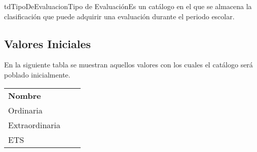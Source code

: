	\begin{TipoDeDato}{tdTipoDeEvaluacion}{Tipo de Evaluación}{Es un catálogo en el que se almacena la clasificación que puede adquirir una evaluación durante el periodo escolar.}
	\begin{tdAtributos}
	\end{tdAtributos}
	
	\subsection{Valores Iniciales}
  En la siguiente tabla se muestran aquellos valores con los cuales el catálogo será poblado inicialmente.
	\begin{longtable}{| p{}| p{}| p{}|}
	 			\rowcolor{colorPrincipal}
	 			\multicolumn{1}{|c|}{\bf \color{white} Valores Iniciales}\\
	 			\hline
	 			\rowcolor{colorSecundario}
	 			\bf \color{white} Nombre\\
	 			\hline
	 			Ordinaria\\
	 			\hline
	 			Extraordinaria\\
	 			\hline
	 			ETS\\
	 			\hline
	 		\end{longtable}
	\end{TipoDeDato}

